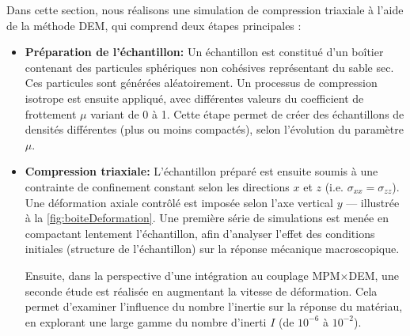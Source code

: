 \documentclass[a4paper,12pt]{report}
\begin{document}
Dans cette section, nous réalisons une simulation de compression triaxiale à l’aide de la méthode DEM, qui comprend deux étapes principales :

\begin{itemize}
    \item \textbf{Préparation de l’échantillon:}  
    Un échantillon est constitué d’un boîtier contenant des particules sphériques non cohésives représentant du sable sec. Ces particules sont générées aléatoirement. Un processus de compression isotrope est ensuite appliqué, avec différentes valeurs du coefficient de frottement  $\mu$ variant de 0 à 1.  
    Cette étape permet de créer des échantillons de densités différentes (plus ou moins compactés), selon l’évolution du paramètre $\mu$.

    \item \textbf{Compression triaxiale:}  
    L’échantillon préparé est ensuite soumis à une contrainte de confinement constant  selon les directions $x$ et $z$ (i.e. $\sigma_{xx} = \sigma_{zz}$). Une déformation axiale contrôlé  est imposée selon l’axe vertical $y$ — illustrée à la \autoref{fig:boiteDeformation}.  
    Une première série de simulations est menée en compactant lentement l’échantillon, afin d’analyser l’effet des conditions initiales (structure de l’échantillon) sur la réponse mécanique macroscopique.

    Ensuite, dans la perspective d’une intégration au couplage MPM$\times$DEM, une seconde étude est réalisée en augmentant la vitesse de déformation. Cela permet d’examiner l’influence du nombre l'inertie sur la réponse du matériau, en explorant une large gamme du nombre d’inerti  $I$ (de $10^{-6}$ à $10^{-2}$).
\end{itemize}
\end{document}
